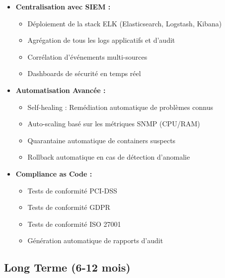 \documentclass[11pt,a4paper]{report}
\begin{document}
\begin{itemize}
    \item \textbf{Centralisation avec SIEM :}
    \begin{itemize}
        \item Déploiement de la stack ELK (Elasticsearch, Logstash, Kibana)
        \item Agrégation de tous les logs applicatifs et d'audit
        \item Corrélation d'événements multi-sources
        \item Dashboards de sécurité en temps réel
    \end{itemize}
    
    \item \textbf{Automatisation Avancée :}
    \begin{itemize}
        \item Self-healing : Remédiation automatique de problèmes connus
        \item Auto-scaling basé sur les métriques SNMP (CPU/RAM)
        \item Quarantaine automatique de containers suspects
        \item Rollback automatique en cas de détection d'anomalie
    \end{itemize}
    
    \item \textbf{Compliance as Code :}
    \begin{itemize}
        \item Tests de conformité PCI-DSS
        \item Tests de conformité GDPR
        \item Tests de conformité ISO 27001
        \item Génération automatique de rapports d'audit
    \end{itemize}
\end{itemize}

\subsection{Long Terme (6-12 mois)}
\end{document}
